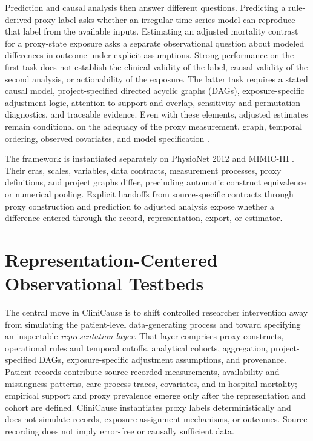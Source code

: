 Prediction and causal analysis then answer different questions.  Predicting a rule-derived proxy label asks whether an irregular-time-series model can reproduce that label from the available inputs.  Estimating an adjusted mortality contrast for a proxy-state exposure asks a separate observational question about modeled differences in outcome under explicit assumptions.  Strong performance on the first task does not establish the clinical validity of the label, causal validity of the second analysis, or actionability of the exposure.  The latter task requires a stated causal model, project-specified directed acyclic graphs (DAGs), exposure-specific adjustment logic, attention to support and overlap, sensitivity and permutation diagnostics, and traceable evidence.  Even with these elements, adjusted estimates remain conditional on the adequacy of the proxy measurement, graph, temporal ordering, observed covariates, and model specification \cite{pearl_1995_causal_diagrams,hernan_robins_2016_target_trial,hernan_taubman_2008_well_defined_interventions}.

The framework is instantiated separately on PhysioNet 2012 and MIMIC-III \cite{silva2012physionet,johnson2016mimiciii}.  Their eras, scales, variables, data contracts, measurement processes, proxy definitions, and project graphs differ, precluding automatic construct equivalence or numerical pooling.  Explicit handoffs from source-specific contracts through proxy construction and prediction to adjusted analysis expose whether a difference entered through the record, representation, export, or estimator.

\section{Representation-Centered Observational Testbeds}
\label{sec:introduction:representation-centered-observational-testbeds}

The central move in CliniCause is to shift controlled researcher intervention away from simulating the patient-level data-generating process and toward specifying an inspectable \emph{representation layer}.  That layer comprises proxy constructs, operational rules and temporal cutoffs, analytical cohorts, aggregation, project-specified DAGs, exposure-specific adjustment assumptions, and provenance.  Patient records contribute source-recorded measurements, availability and missingness patterns, care-process traces, covariates, and in-hospital mortality; empirical support and proxy prevalence emerge only after the representation and cohort are defined.  CliniCause instantiates proxy labels deterministically and does not simulate records, exposure-assignment mechanisms, or outcomes.  Source recording does not imply error-free or causally sufficient data.

